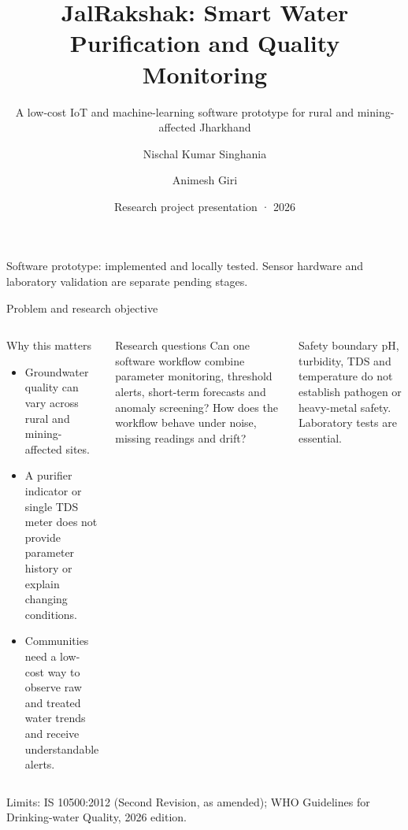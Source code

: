 \documentclass[aspectratio=169,10pt]{beamer}
\title[JalRakshak]{JalRakshak: Smart Water Purification and Quality Monitoring}
\subtitle{A low-cost IoT and machine-learning software prototype for rural and mining-affected Jharkhand}
\author[Nischal Singhania and Animesh Giri]{Nischal Kumar Singhania \and Animesh Giri}
\institute{B.Tech Computer Science and Engineering (CCVT) · Third Year}
\date{Research project presentation · 2026}
\begin{document}
\begin{frame}
  \titlepage
  \vspace{-0.6em}
  \begin{center}
    \footnotesize Software prototype: implemented and locally tested. Sensor hardware and laboratory validation are separate pending stages.
  \end{center}
\end{frame}

\begin{frame}{Problem and research objective}
\begin{columns}[T,onlytextwidth]
  \begin{block}{Why this matters}
    \begin{itemize}
      \item Groundwater quality can vary across rural and mining-affected sites.
      \item A purifier indicator or single TDS meter does not provide parameter history or explain changing conditions.
      \item Communities need a low-cost way to observe raw and treated water trends and receive understandable alerts.
    \end{itemize}
  \end{block}
  \begin{block}{Research questions}
    Can one software workflow combine parameter monitoring, threshold alerts, short-term forecasts and anomaly screening? How does the workflow behave under noise, missing readings and drift?
  \end{block}
  \begin{alertblock}{Safety boundary}
    pH, turbidity, TDS and temperature do not establish pathogen or heavy-metal safety. Laboratory tests are essential.
  \end{alertblock}
\end{columns}
\vfill
{\tiny Limits: IS 10500:2012 (Second Revision, as amended); WHO Guidelines for Drinking-water Quality, 2026 edition.}
\end{frame}
\end{document}
